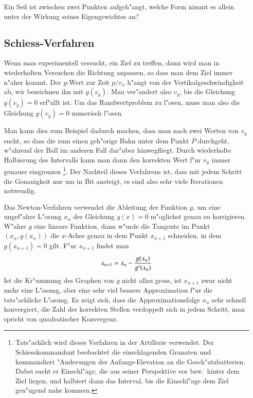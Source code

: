 \begin{aufgabe}
\label{numerik:aufgabe-seil}
Ein Seil ist zwischen zwei Punkten aufgeh"angt, welche Form nimmt es
allein unter der Wirkung seines Eigengewichtes an?
\end{aufgabe}

\subsection{Schiess-Verfahren\label{numerik:schiess-verfahren}}
Wenn man experimentell versucht, ein Ziel zu treffen, dann wird man
in wiederholten Versuchen die Richtung anpassen, so dass man dem Ziel
immer n"aher kommt.
Der $y$-Wert zur Zeit $p/v_x$ h"angt von der Vertikalgeschwindigkeit ab,
wir bezeichnen ihn mit $g(v_y)$.
Man ver"andert also $v_y$, bis die Gleichung $g(v_y)=0$ erf"ullt ist.
Um das Randwertproblem zu l"osen, muss man also die Gleichung $g(v_y)=0$
numerisch l"osen.

Man kann dies zum Beispiel dadurch machen, dass man nach zwei Werten von $v_y$
sucht, so dass die zum einen geh"orige Bahn unter dem Punkt $P$ durchgeht,
w"ahrend der Ball im anderen Fall dar"uber hinwegfliegt.
Durch wiederholte Halbierung des Intervalls kann man dann den korrekten
Wert f"ur $v_y$ immer genauer eingrenzen%
\footnote{%
Tats"achlich wird dieses Verfahren in der Artillerie verwendet.
Der Schiesskommandant beobachtet die einschlagenden Granaten und kommandiert
"Anderungen der Anfangs-Elevation an die Gesch"utzbatterien.
Dabei sucht er Einschl"age, die aus seiner Perspektive vor bzw.~hinter
dem Ziel liegen, und halbiert dann das Interval, bis die Einschl"age dem
Ziel gen"ugend nahe kommen.}.
Der Nachteil dieses Verfahrens ist, dass mit jedem Schritt die Genauigkeit
nur um in Bit ansteigt, es sind also sehr viele Iterationen notwendig.

Das Newton-Verfahren verwendet die Ableitung der Funktion $g$, um eine
ungef"ahre L"osung $x_n$ der Gleichung $g(x)=0$ m"oglichst genau zu
korrigieren.
W"ahre $g$ eine lineare Funktion, dann w"urde die Tangente im Punkt
$(x_n, g(x_n))$ die $x$-Achse genau in dem Punkt $x_{n+1}$ schneiden,
in dem $g(x_{n+1})=0$ gilt.
F"ur $x_{n+1}$ findet man
\begin{equation}
x_{n+1}=x_{\mathstrut n} - \frac{g(x_n)}{g'(x_n)}
\label{numerik:ball-newton}
\end{equation}
Ist die Kr"ummung des Graphen von $g$ nicht allzu gross, ist $x_{n+1}$
zwar nicht mehr eine L"osung, aber eine sehr viel bessere Approximation
f"ur die tats"achliche L"osung.
Es zeigt sich, dass die Approximationsfolge $x_n$ sehr schnell konvergiert,
die Zahl der korrekten Stellen verdoppelt sich in jedem Schritt, man
spricht von quadratischer Konvergenz.

